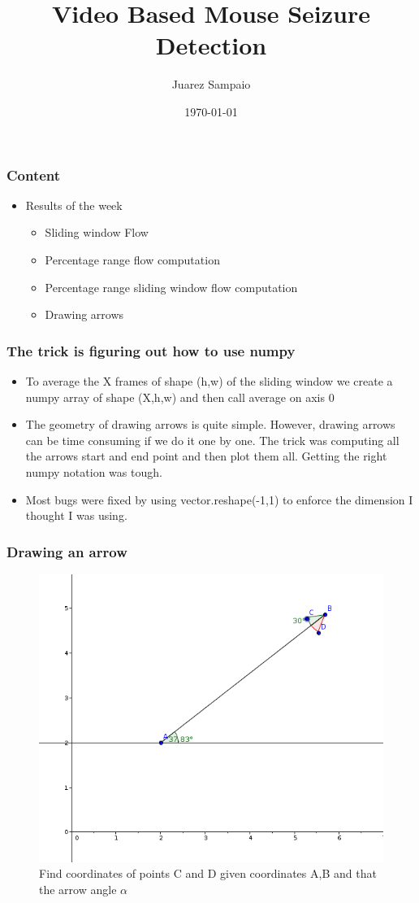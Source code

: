 \documentclass{beamer}
\title{Video Based Mouse Seizure Detection}
\author{Juarez Sampaio}
\institute{Rice University}
\date{\today}
\begin{document}
\begin{frame}
        \titlepage
\end{frame}

\begin{frame}[fragile]
  \frametitle{Content}
  \begin{itemize}
     \item Results of the week
       \begin{itemize}
           \item Sliding window Flow 
           \item Percentage range flow computation
           \item Percentage range sliding window flow computation
           \item Drawing arrows
       \end{itemize}
  \end{itemize}
\end{frame}


\begin{frame}
  \frametitle{The trick is figuring out how to use numpy}
  \begin{itemize}
      \item To average the X frames of shape (h,w) of the sliding window we create a numpy array of shape (X,h,w)
      and then call average on axis 0
      \item The geometry of drawing arrows is quite simple. However, drawing arrows can be time consuming if we do it
        one by one. The trick was computing all the arrows start and end point and then plot them all. Getting the right
        numpy notation was tough.
      \item Most bugs were fixed by using vector.reshape(-1,1) to enforce the dimension I thought I was using.
  \end{itemize}
\end{frame}


\begin{frame}
  \frametitle{Drawing an arrow}
  \begin{figure}
    \centering
    \includegraphics[scale=0.3]{./arrowDraw.png}
    \caption{Find coordinates of points C and D given coordinates A,B and that the arrow angle $\alpha$}
  \end{figure}
\end{frame}
\end{document}
